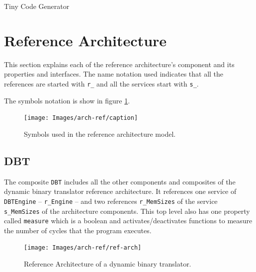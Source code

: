 \documentclass{report}
\begin{document}
	Tiny Code Generator
	

	
\newpage
	
	\section{Reference Architecture}
	
	\par This section explains each of the reference architecture's component and its properties and interfaces. The name notation used indicates that all the references are started with \texttt{r\_} and all the services start with \texttt{s\_}.
	\par The symbols notation is show in figure \ref{fig:caption}.
	
	\begin{figure} [H]
		\centering
		\texttt{[image: Images/arch-ref/caption]}
		\caption{Symbols used in the reference architecture model.}
		\label{fig:caption}
	\end{figure}

	
		\subsection{DBT}
		
		\par The composite \texttt{DBT} includes all the other components and composites of the dynamic binary translator reference architecture. It references one service of \texttt{DBTEngine} -- \texttt{r\_Engine} -- and two references \texttt{r\_MemSizes} of the service \texttt{s\_MemSizes} of the architecture components. This top level also has one property called \texttt{measure} which is a boolean and activates/deactivates functions to measure the number of cycles that the program executes.
		
		\begin{figure} [H]
			\centering
			\texttt{[image: Images/arch-ref/ref-arch]}
			\caption{Reference Architecture of a dynamic binary translator.}
			\label{fig:ref-arch}
		\end{figure}	
	
\end{document}

